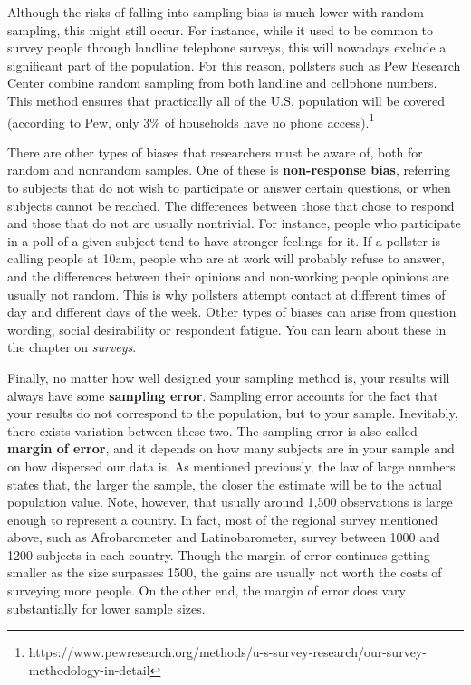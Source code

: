 \documentclass{book}
\begin{document}
Although the risks of falling into sampling bias is much lower with random
sampling, this might still occur. For instance, while it used to be common to
survey people through landline telephone surveys, this will nowadays exclude a
significant part of the population. For this reason, pollsters such as Pew
Research Center combine random sampling from both landline and cellphone
numbers. This method ensures that practically all of the U.S. population will
be covered (according to Pew, only 3\% of households have no phone
access).\footnote{https://www.pewresearch.org/methods/u-s-survey-research/our-survey-methodology-in-detail}

There are other types of biases that researchers must be aware of, both for
random and nonrandom samples. One of these is \textbf{non-response bias},
referring to subjects that do not wish to participate or answer certain
questions, or when subjects cannot be reached. The differences between those
that chose to respond and those that do not are usually nontrivial. For
instance, people who participate in a poll of a given subject tend to have
stronger feelings for it. If a pollster is calling people at 10am, people who
are at work will probably refuse to answer, and the differences between their
opinions and non-working people opinions are usually not random. This is why
pollsters attempt contact at different times of day and different days of the
week. Other types of biases can arise from question wording, social
desirability or respondent fatigue. You can learn about these in the chapter
on \emph{surveys}.

Finally, no matter how well designed your sampling method is, your results
will always have some \textbf{sampling error}. Sampling error accounts for the
fact that your results do not correspond to the population, but to your
sample. Inevitably, there exists variation between these two. The sampling
error is also called \textbf{margin of error}, and it depends on how many
subjects are in your sample and on how dispersed our data is. As mentioned
previously, the law of large numbers states that, the larger the sample, the
closer the estimate will be to the actual population value. Note, however,
that usually around 1,500 observations is large enough to represent a country.
In fact, most of the regional survey mentioned above, such as Afrobarometer
and Latinobarometer, survey between 1000 and 1200 subjects in each country.
Though the margin of error continues getting smaller as the size surpasses
1500, the gains are usually not worth the costs of surveying more people. On
the other end, the margin of error does vary substantially for lower sample
sizes.
\end{document}

